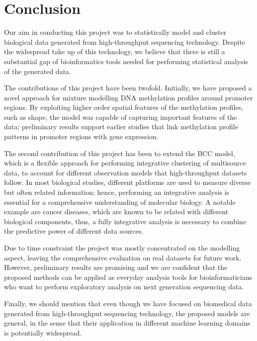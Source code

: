 \chapter{Conclusion} \label{conclusion-chapter}
Our aim in conducting this project was to statistically model and cluster biological data generated from high-throughput sequencing technology. Despite the widespread take up of this technology, we believe that there is still a substantial gap of bioinformatics tools needed for performing statistical analysis of the generated data.

The contributions of this project have been twofold. Initially, we have proposed a novel approach for mixture modelling DNA methylation profiles around promoter regions. By exploiting higher order spatial features of the methylation profiles, such as shape, the model was capable of capturing important features of the data; preliminary results support earlier studies that link methylation profile patterns in promoter regions with gene expression. 

The second contribution of this project has been to extend the BCC model, which is a flexible approach for performing integrative clustering of multisource data, to account for different observation models that high-throughput datasets follow. In most biological studies, different platforms are used to measure diverse but often related information; hence, performing an integrative analysis is essential for a comprehensive understanding of molecular biology. A notable example are cancer diseases, which are known to be related with different biological components, thus, a fully integrative analysis is necessary to combine the predictive power of different data sources.  

Due to time constraint the project was mostly concentrated on the modelling aspect, leaving the comprehensive evaluation on real datasets for future work. However, preliminary results are promising and we are confident that the proposed methods can be applied as everyday analysis tools for bioinformaticians who want to perform exploratory analysis on next generation sequencing data.

Finally, we should mention that even though we have focused on biomedical data generated from high-throughput sequencing technology, the proposed models are general, in the sense that their application in different machine learning domains is potentially widespread. 

